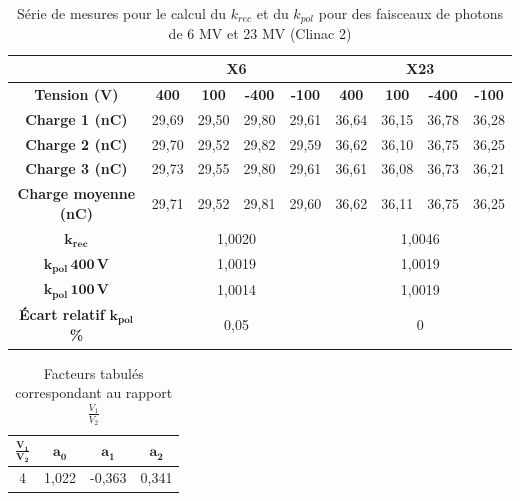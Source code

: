 \documentclass{article}
\begin{document}
\begin{table}[h]
  \centering
  \begin{tabular}{c|cccc|cccc|}
  \cline{2-9}
                                                     & \multicolumn{4}{c|}{\textbf{X6}} & \multicolumn{4}{c|}{\textbf{X23}} \\ \hline
  \multicolumn{1}{|c|}{\textbf{Tension (V)}} & \textbf{400} & \textbf{100} & \textbf{-400} & \textbf{-100} & \textbf{400} & \textbf{100} & \textbf{-400} & \textbf{-100} \\ \hline
  \multicolumn{1}{|c|}{\textbf{Charge 1 (nC)}}       & 29,69  & 29,50  & 29,80  & 29,61 & 36,64  & 36,15  & 36,78  & 36,28  \\
  \multicolumn{1}{|c|}{\textbf{Charge 2 (nC)}}       & 29,70   & 29,52  & 29,82  & 29,59 & 36,62  & 36,10  & 36,75  & 36,25  \\
  \multicolumn{1}{|c|}{\textbf{Charge 3 (nC)}}       & 29,73  & 29,55  & 29,80  & 29,61 & 36,61  & 36,08  & 36,73  & 36,21  \\
  \multicolumn{1}{|c|}{\textbf{Charge moyenne (nC)}} & 29,71  & 29,52  & 29,81  & 29,60 & 36,62  & 36,11  & 36,75  & 36,25  \\ \hline
  \multicolumn{1}{|c|}{$\mathbf{k_{rec}}$}                & \multicolumn{4}{c|}{1,0020}      & \multicolumn{4}{c|}{1,0046}       \\
  \multicolumn{1}{|c|}{$\mathbf{k_{pol} \, 400 \, V}$}          & \multicolumn{4}{c|}{1,0019}      & \multicolumn{4}{c|}{1,0019}       \\
  \multicolumn{1}{|c|}{$\mathbf{k_{pol} \, 100 \, V}$}          & \multicolumn{4}{c|}{1,0014}      & \multicolumn{4}{c|}{1,0019}       \\ 
  \multicolumn{1}{|c|}{\textbf{Écart relatif} $\mathbf{k_{pol}}$ \textbf{\%}} & \multicolumn{4}{c|}{0,05} & \multicolumn{4}{c|}{0} \\
  \hline
  \end{tabular}
  \caption{Série de mesures pour le calcul du $k_{rec}$ et du $k_{pol}$ pour des faisceaux de photons de 6 MV et 23 MV (Clinac 2)}
  \label{table_kpol}
\end{table}



\begin{table}[h]
  \centering
  \begin{tabular}{cccc}
    \toprule
    $\mathbf{\frac{V_1}{V_2}}$ & $\mathbf{a_0}$ & $\mathbf{a_1}$ & $\mathbf{a_2}$\\
    \toprule
    4 & 1,022 & -0,363 & 0,341\\
    \bottomrule    
  \end{tabular}
  \caption{Facteurs tabulés correspondant au rapport $\frac{V_1}{V_2}$}
  \label{table_facteurs_krec}
\end{table}
\end{document}
